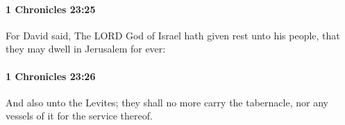 		\paragraph{1 Chronicles 23:25} %
			\label{1CHRONICLES-23-25}

			For David said, The LORD God of Israel hath given rest unto his people, that they may dwell in Jerusalem for ever:


		\paragraph{1 Chronicles 23:26} %
			\label{1CHRONICLES-23-26}

			And also unto the Levites; they shall no more carry the tabernacle, nor any vessels of it for the service thereof.


